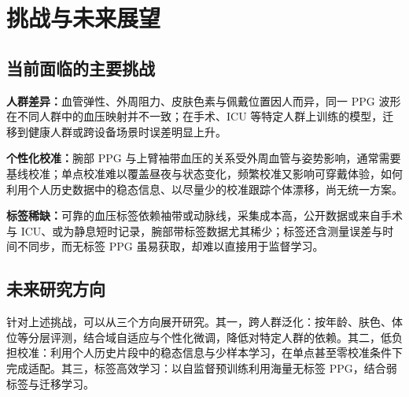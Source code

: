 
\section{挑战与未来展望}
\label{sec:challenges}

\subsection{当前面临的主要挑战}
\label{sec:open_issues}

\noindent\textbf{人群差异：}血管弹性、外周阻力、皮肤色素与佩戴位置因人而异，同一 PPG 波形在不同人群中的血压映射并不一致；在手术、ICU 等特定人群上训练的模型，迁移到健康人群或跨设备场景时误差明显上升。

\noindent\textbf{个性化校准：}腕部 PPG 与上臂袖带血压的关系受外周血管与姿势影响，通常需要基线校准；单点校准难以覆盖昼夜与状态变化，频繁校准又影响可穿戴体验，如何利用个人历史数据中的稳态信息、以尽量少的校准跟踪个体漂移，尚无统一方案。

\noindent\textbf{标签稀缺：}可靠的血压标签依赖袖带或动脉线，采集成本高，公开数据或来自手术与 ICU、或为静息短时记录，腕部带标签数据尤其稀少；标签还含测量误差与时间不同步，而无标签 PPG 虽易获取，却难以直接用于监督学习。

\subsection{未来研究方向}
\label{sec:future}

针对上述挑战，可以从三个方向展开研究。其一，跨人群泛化：按年龄、肤色、体位等分层评测，结合域自适应与个性化微调，降低对特定人群的依赖。其二，低负担校准：利用个人历史片段中的稳态信息与少样本学习，在单点甚至零校准条件下完成适配。其三，标签高效学习：以自监督预训练利用海量无标签 PPG，结合弱标签与迁移学习。

